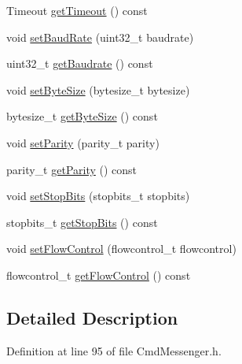 \begin{DoxyCompactItemize}
\item 
Timeout \hyperlink{classcmd_1_1_cmd_messenger_a6b8a4f763475a9e4fbef2237f1050849}{get\+Timeout} () const 
\item 
void \hyperlink{classcmd_1_1_cmd_messenger_a0fc1bac4fc0d3494893113ade503099b}{set\+Baud\+Rate} (uint32\+\_\+t baudrate)
\item 
uint32\+\_\+t \hyperlink{classcmd_1_1_cmd_messenger_a14c580579b5311ff78cce8de34fe63b2}{get\+Baudrate} () const 
\item 
void \hyperlink{classcmd_1_1_cmd_messenger_ae05db8b37c1b2ee9be47ea3a3bf045bd}{set\+Byte\+Size} (bytesize\+\_\+t bytesize)
\item 
bytesize\+\_\+t \hyperlink{classcmd_1_1_cmd_messenger_a8ccc24a1f621afd1e114696ed9b8b261}{get\+Byte\+Size} () const 
\item 
void \hyperlink{classcmd_1_1_cmd_messenger_ae0bbc0b786fadff310f31c84644b56c5}{set\+Parity} (parity\+\_\+t parity)
\item 
parity\+\_\+t \hyperlink{classcmd_1_1_cmd_messenger_ad487f6fd40a2bffc69fab5334d96ab52}{get\+Parity} () const 
\item 
void \hyperlink{classcmd_1_1_cmd_messenger_a06eaedc3c9e7b0b3cda7b139ee61f5bb}{set\+Stop\+Bits} (stopbits\+\_\+t stopbits)
\item 
stopbits\+\_\+t \hyperlink{classcmd_1_1_cmd_messenger_a2dd6e45584ed65ff1f744e46198e7755}{get\+Stop\+Bits} () const 
\item 
void \hyperlink{classcmd_1_1_cmd_messenger_a5271d79b0f4ae95bea5897b214fbbd4c}{set\+Flow\+Control} (flowcontrol\+\_\+t flowcontrol)
\item 
flowcontrol\+\_\+t \hyperlink{classcmd_1_1_cmd_messenger_a11e2bea7282a912fd05644b403b55503}{get\+Flow\+Control} () const 
\end{DoxyCompactItemize}


\subsection{Detailed Description}


Definition at line 95 of file Cmd\+Messenger.\+h.



